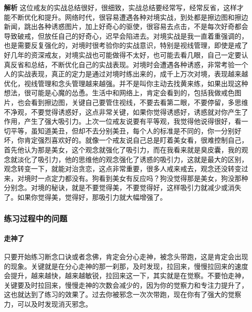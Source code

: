 \begin{case}[实战水平提升的过程]
    \textbf{解析} 这位戒友的实战总结很好，很细致，实战总结要经常写，经常反省，这样才能不断优化和提升。网络时代，很容易遭遇各种对境实战，到处都是擦边图和擦边新闻，跳出各种诱惑图片，加上好奇心的驱使，很容易去点击，不是每次好奇都会导致破戒，但放任自己的好奇心，迟早会陷进去。对境实战是我一直着重强调的，也是需要反复强化的，对境时很考验你的实战意识，特别是视线管理，即使是戒了好几年的资深戒友，对境实战也可能做得不太好，也可能去看几眼，自己一定要认真反省和总结，不断优化自己的实战表现。对境时会遭遇各种诱惑，非常考验一个人的实战表现，真正的定力是通过对境时练出来的，成千上万次对境，表现越来越优化，视线管理和念头管理越来越强。并不是叫你主动去找黄来练，如果出现这种想法，很可能是心魔的怂恿。生活中和网络上，肯定会看到的，包括我做戒色图片，也会看到擦边图，关键自己要管住视线，不要去看第二眼，不要停留，多思维不净观，不要觉得诱惑好，这点非常关键，如果你觉得诱惑好，诱惑就对你产生了作用，产生了强大吸引力。上次一位戒友说要有平等观，我觉得他说得很好，看一切平等，虽知道美丑，但却不去分别美丑，每个人的标准是不同的，你一分别好坏，你肯定强烈喜欢好的。就像一个戒友说自己总是盯着美女看，很难控制自己，首先他认为那是美女，这个观念就强化了吸引力，而在我看来就是臭皮囊，我的观念就淡化了吸引力，他的思维他的观念强化了诱惑的吸引力，这就是最大的区别，观念转变一下，就能对治贪恋，这点非常重要，很多人戒来戒去，观念还没转变过来，对境时一点定力都没有。狗看到美女有反应吗？狗没觉得那是美女，狗没那种分别念。对境的秘诀，就是不要觉得美，不要觉得好，这样吸引力就减少或消失了。如果你觉得美，觉得好，那吸引力就大幅增强了。
\end{case}

\subsubsection{练习过程中的问题}

\paragraph{走神了}

只要开始练习断念口诀或者念佛，肯定会分心走神，被念头带跑，这是肯定会出现的现象。关键就是在分心走神的那一刹那，及时发现，拉回来，慢慢拉回来的速度会提升，越来越快，越来越敏锐，拉回来这一下，其实就是在觉察。不要怕走神，关键要及时拉回来，慢慢走神的次数会减少的，因为你的觉察力和专注力提升了，这也就达到了练习的效果了。过去你被邪念一次次带跑，现在你有了强大的觉察力，可以及时发现消灭邪念。

